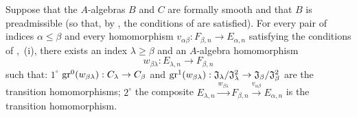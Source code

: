 \begin{lemma}[19.5.6.5]
\label{0.19.5.6.5}
Suppose that the $A$-algebras $B$ and $C$ are formally smooth and that $B$ is preadmissible (so that, by , the conditions of  are satisfied).
For every pair of indices $\alpha\leq\beta$ and every homomorphism
$v_{\alpha\beta}:F_{\beta,n}\to E_{\alpha,n}$ satisfying the conditions of
,~{\rm(i)}, there exists an index $\lambda\geq\beta$ and an
$A$-algebra homomorphism
\[
  w_{\beta\lambda}:E_{\lambda,n}\to F_{\beta,n}
\]
such that:
$1^\circ$ $\operatorname{gr}^0(w_{\beta\lambda}):C_\lambda\to C_\beta$ and
$\operatorname{gr}^1(w_{\beta\lambda}):\mathfrak{J}_\lambda/\mathfrak{J}_\lambda^2
\to\mathfrak{J}_\beta/\mathfrak{J}_\beta^2$ are the transition homomorphisms;
$2^\circ$ the composite
$E_{\lambda,n}\xrightarrow{w_{\beta\lambda}}F_{\beta,n}
\xrightarrow{v_{\alpha\beta}}E_{\alpha,n}$ is the transition homomorphism.
\end{lemma}

